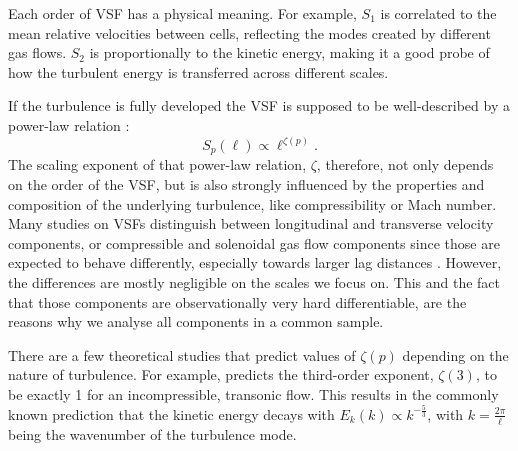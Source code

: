 Each order of VSF has a physical meaning. 
For example, $\mathit{S}_1$ is correlated to the mean relative velocities between cells, reflecting the modes created by different gas flows.
$\mathit{S}_2$ is proportionally to the kinetic energy, making it a good probe of how the turbulent energy is transferred across different scales.

If the turbulence is fully developed the VSF is supposed to be well-described by a power-law relation \citep{Kolmogorov1941,She1994,Boldyrev2002}:
\begin{equation}
	\mathit{S}_p (\ell) \propto \ell^{\zeta(p)} .
    \label{equ:method:propto_zeta}
\end{equation}
The scaling exponent of that power-law relation, $\zeta$, therefore, not only depends on the order of the VSF, but is also strongly influenced by the properties and composition of the underlying turbulence, like compressibility or Mach number.
Many studies on VSFs  distinguish between longitudinal and transverse velocity components, or compressible and solenoidal gas flow components since those are expected to behave differently, especially towards larger lag distances \citep{Gotoh2002,Schmidt2008,Benzi2010}.
However, the differences are mostly negligible on the scales we focus on. 
This and the fact that those components are observationally very hard differentiable, are the reasons why we analyse all components in a common sample.

There are a few theoretical studies that predict values of $\zeta(p)$ depending on the nature of turbulence.
For example, \citet{Kolmogorov1941} predicts the third-order exponent, $\zeta(3)$, to be exactly 1 for an incompressible, transonic flow.
This results in the commonly known prediction that the kinetic energy decays with $E_k(k) \propto k^{-\frac{5}{3}}$, with $k = \frac{2 \pi}{\ell}$ being the wavenumber of the turbulence mode.

